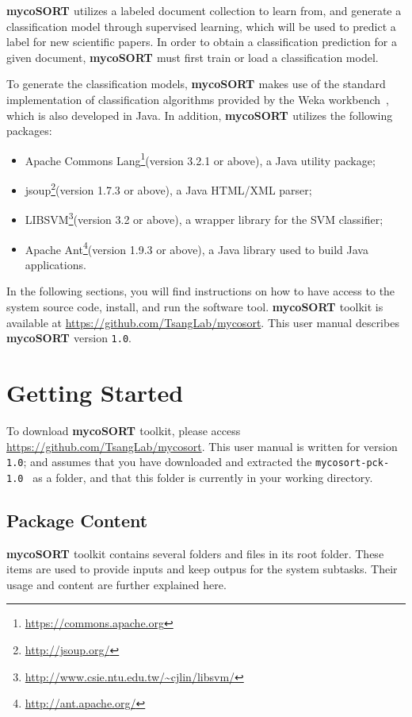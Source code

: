 \documentclass[11pt]{article}
\newcommand{\mycos}{{\bf{mycoSORT{ }}}}
\newcommand{\homefolder}{\texttt{mycosort-pck-\version{ }}}
\def\version{{\tt 1.0}}
\begin{document}
\mycos{} utilizes a labeled document collection to learn from, 
and generate a classification model through supervised learning, 
which will be used to predict a label for new scientific papers.
In order to obtain a classification prediction for a given document, 
\mycos{} must first train or load a classification model.

To generate the classification models, \mycos{} makes use of the standard implementation 
of classification algorithms provided by the Weka workbench~\cite{hall2009weka}, 
which is also developed in Java.
In addition, \mycos{} utilizes the following packages:
\begin{itemize}
 \item Apache Commons Lang\footnote{\url{https://commons.apache.org}}(version 3.2.1 or above), a Java utility package;
 \item jsoup\footnote{\url{http://jsoup.org/}}(version 1.7.3 or above), a Java HTML/XML parser;
 \item LIBSVM\footnote{\url{http://www.csie.ntu.edu.tw/~cjlin/libsvm/}}(version 3.2 or above), a wrapper library for the SVM classifier;
 \item Apache Ant\footnote{\url{http://ant.apache.org/}}(version 1.9.3 or above), a Java library used to build Java applications.
\end{itemize}

In the following sections, you will find instructions on how to 
have access to the system source code, install, and run the software tool.
\mycos{} toolkit is available at \url{https://github.com/TsangLab/mycosort}.
This user manual describes \mycos{} version {\version}. 

\section{Getting Started}
\label{sec:start}
To download \mycos{} toolkit, please access \url{https://github.com/TsangLab/mycosort}. 
This user manual is written for version \version; 
and assumes that you have downloaded and extracted the \homefolder{} as a folder, 
and that this folder is currently in your working directory.

\subsection{Package Content}
\label{subsec:pckcontent}
\mycos{} toolkit contains several folders and files in its root folder.
These items are used to provide inputs and keep outpus for the system subtasks. 
Their usage and content are further explained here. 
\end{document}
